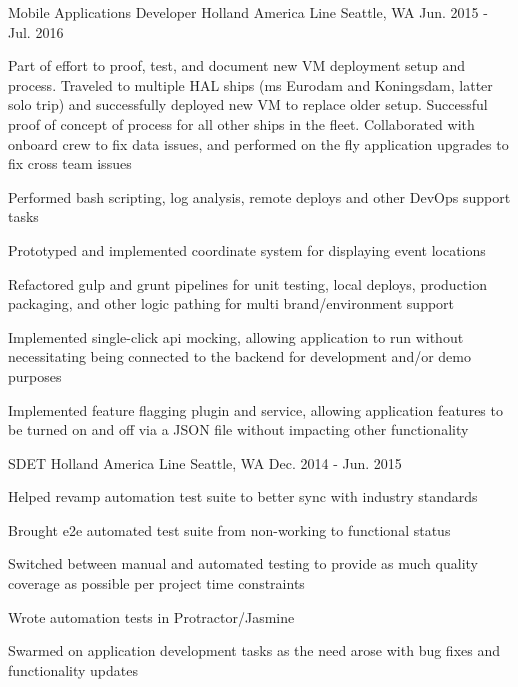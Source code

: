 \begin{cventries}
\cventry
{Mobile Applications Developer} %
{Holland America Line} %
{Seattle, WA} %
{Jun. 2015 - Jul. 2016} %
{
\begin{cvitems}
\item {Part of effort to proof, test, and document new VM deployment setup and process. Traveled to multiple HAL ships (ms Eurodam and Koningsdam, latter solo trip) and successfully deployed new VM to replace older setup. Successful proof of concept of process for all other ships in the fleet. Collaborated with onboard crew to fix data issues, and performed on the fly application upgrades to fix cross team issues}
\item {Performed bash scripting, log analysis, remote deploys and other DevOps support tasks}
\item {Prototyped and implemented coordinate system for displaying event locations}
\item {Refactored gulp and grunt pipelines for unit testing, local deploys, production packaging, and other logic pathing for multi brand/environment support}
\item {Implemented single-click api mocking, allowing application to run without necessitating being connected to the backend for development and/or demo purposes}
\item {Implemented feature flagging plugin and service, allowing application features to be turned on and off via a JSON file without impacting other functionality}
\end{cvitems}
}

\cventry
{SDET} %
{Holland America Line} %
{Seattle, WA} %
{Dec. 2014 - Jun. 2015} %
{
\begin{cvitems}
\item {Helped revamp automation test suite to better sync with industry standards}
\item {Brought e2e automated test suite from non-working to functional status}
\item {Switched between manual and automated testing to provide as much quality coverage as possible per project time constraints}
\item {Wrote automation tests in Protractor/Jasmine}
\item {Swarmed on application development tasks as the need arose with bug fixes and functionality updates}
\end{cvitems}
}


\end{cventries}
